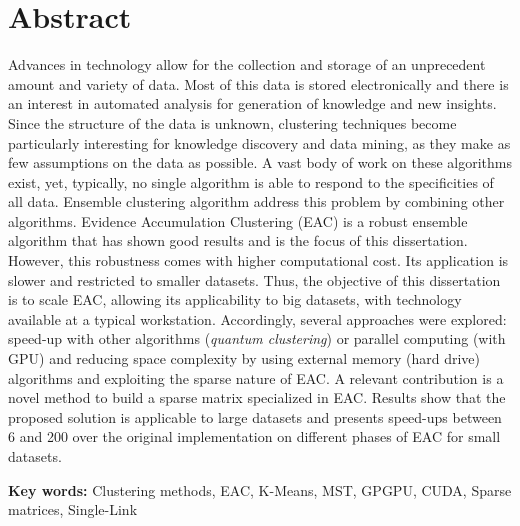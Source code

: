 
\section*{Abstract}


Advances in technology allow for the collection and storage of an unprecedent amount and variety of data.
Most of this data is stored electronically and there is an interest in automated analysis for generation of knowledge and new insights.
Since the structure of the data is unknown, clustering techniques become particularly interesting for knowledge discovery and data mining, as they make as few assumptions on the data as possible.
A vast body of work on these algorithms exist, yet, typically, no single algorithm is able to respond to the specificities of all data.
Ensemble clustering algorithm address this problem by combining other algorithms.
Evidence Accumulation Clustering (EAC) is a robust ensemble algorithm that has shown good results and is the focus of this dissertation.
However, this robustness comes with higher computational cost.
Its application is slower and restricted to smaller datasets.
Thus, the objective of this dissertation is to scale EAC, allowing its applicability to big datasets, with technology available at a typical workstation.
Accordingly, several approaches were explored: speed-up with other algorithms (\emph{quantum clustering}) or parallel computing (with GPU) and reducing space complexity by using external memory (hard drive) algorithms and exploiting the sparse nature of EAC.
A relevant contribution is a novel method to build a sparse matrix specialized in EAC.
Results show that the proposed solution is applicable to large datasets and presents speed-ups between 6 and 200 over the original implementation on different phases of EAC for small datasets.

\vfill

\textbf{\Large Key words:} Clustering methods, EAC, K-Means, MST, GPGPU, CUDA, Sparse matrices, Single-Link

\cleardoublepage


